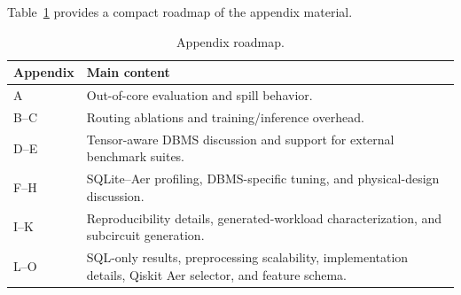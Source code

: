 
\clearpage
 
\begin{appendices}

\appendix

\noindent Table~\ref{tab:appendix-roadmap} provides a compact roadmap of the appendix material.

\begin{table}[H]
\centering
\caption{Appendix roadmap.}
\label{tab:appendix-roadmap}
\renewcommand{\arraystretch}{1.08}
\begin{tabularx}{\columnwidth}{@{}p{}X@{}}
\toprule
Appendix & Main content \\
\midrule
A & Out-of-core evaluation and spill behavior. \\
B--C & Routing ablations and training/inference overhead. \\
D--E & Tensor-aware DBMS discussion and support for external benchmark suites. \\
F--H & SQLite--Aer profiling, DBMS-specific tuning, and physical-design discussion. \\
I--K & Reproducibility details, generated-workload characterization, and subcircuit generation. \\
L--O & SQL-only results, preprocessing scalability, implementation details, Qiskit Aer selector, and feature schema. \\
\bottomrule
\end{tabularx}
\end{table}


\end{appendices}
